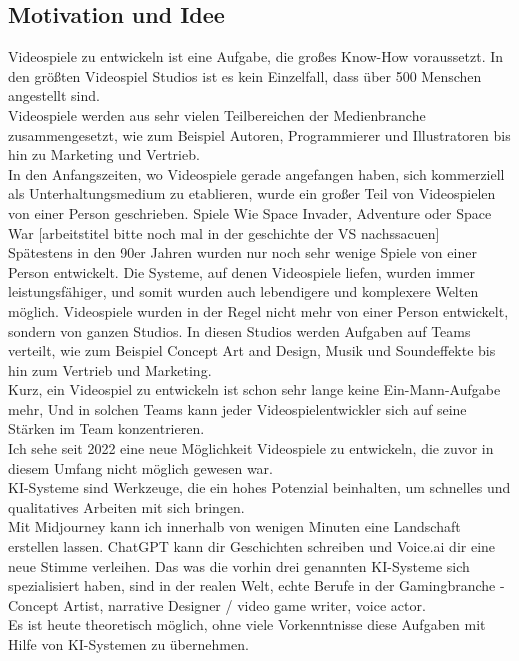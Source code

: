 \documentclass[12pt,a4paper,bibliography=totocnumbered,listof=totocnumbered]{scrartcl}
\begin{document}
\subsection{Motivation und Idee}
Videospiele zu entwickeln ist eine Aufgabe, die großes Know-How voraussetzt. In den größten Videospiel Studios ist es kein Einzelfall, dass über 500 Menschen angestellt sind.
\\
Videospiele werden aus sehr vielen Teilbereichen der Medienbranche zusammengesetzt, wie zum Beispiel Autoren, Programmierer und Illustratoren bis hin zu Marketing und Vertrieb.
\\
In den Anfangszeiten, wo Videospiele gerade angefangen haben, sich kommerziell als Unterhaltungsmedium zu etablieren, wurde ein großer Teil von Videospielen von einer Person geschrieben. Spiele Wie Space Invader, Adventure oder Space War [arbeitstitel bitte noch mal in der geschichte der VS nachssacuen]
\\
Spätestens in den 90er Jahren wurden nur noch sehr wenige Spiele von einer Person entwickelt. Die Systeme, auf denen Videospiele liefen, wurden immer leistungsfähiger, und somit wurden auch lebendigere und komplexere Welten möglich. Videospiele wurden in der Regel nicht mehr von einer Person entwickelt, sondern von ganzen Studios. In diesen Studios werden Aufgaben auf Teams verteilt, wie zum Beispiel Concept Art and Design, Musik und Soundeffekte bis hin zum Vertrieb und Marketing.
\\
Kurz, ein Videospiel zu entwickeln ist schon sehr lange keine Ein-Mann-Aufgabe mehr, Und in solchen Teams kann jeder Videospielentwickler sich auf seine Stärken im Team konzentrieren.
\\
Ich sehe seit 2022 eine neue Möglichkeit Videospiele zu entwickeln, die zuvor in diesem Umfang nicht möglich gewesen war.
\\
KI-Systeme sind Werkzeuge, die ein hohes Potenzial beinhalten, um schnelles und qualitatives Arbeiten mit sich bringen.
\\
Mit Midjourney kann ich innerhalb von wenigen Minuten eine Landschaft erstellen lassen. ChatGPT kann dir Geschichten schreiben und Voice.ai dir eine neue Stimme verleihen. Das was die vorhin drei genannten KI-Systeme sich spezialisiert haben, sind in der realen 
Welt, echte Berufe in der Gamingbranche - Concept Artist, narrative Designer / video game writer, voice actor.
\\
Es ist heute theoretisch möglich, ohne viele Vorkenntnisse diese Aufgaben mit Hilfe von KI-Systemen zu übernehmen.
\end{document}
